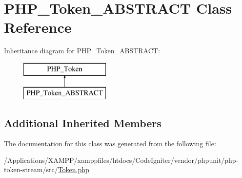 \hypertarget{class_p_h_p___token___a_b_s_t_r_a_c_t}{}\section{P\+H\+P\+\_\+\+Token\+\_\+\+A\+B\+S\+T\+R\+A\+CT Class Reference}
\label{class_p_h_p___token___a_b_s_t_r_a_c_t}
Inheritance diagram for P\+H\+P\+\_\+\+Token\+\_\+\+A\+B\+S\+T\+R\+A\+CT\+:\begin{figure}[H]
\begin{center}
\leavevmode
\includegraphics[height=2.000000cm]{class_p_h_p___token___a_b_s_t_r_a_c_t}
\end{center}
\end{figure}
\subsection*{Additional Inherited Members}


The documentation for this class was generated from the following file\+:\begin{DoxyCompactItemize}
\item 
/\+Applications/\+X\+A\+M\+P\+P/xamppfiles/htdocs/\+Code\+Igniter/vendor/phpunit/php-\/token-\/stream/src/\mbox{\hyperlink{_token_8php}{Token.\+php}}\end{DoxyCompactItemize}
